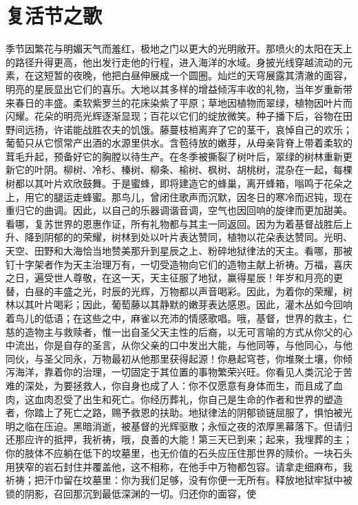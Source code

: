 
\chapter{复活节之歌}


\par

季节因繁花与明媚天气而羞红，极地之门以更大的光明敞开。那喷火的太阳在天上的路径升得更高，他出发行走他的行程，进入海洋的水域。身披光线穿越流动的元素，在这短暂的夜晚，他把白昼伸展成一个圆圈。灿烂的天穹展露其清澈的面容，明亮的星辰显出它们的喜乐。大地以其多样的增益倾泻丰收的礼物，当年岁重新带来春日的丰盛。柔软紫罗兰的花床染紫了平原；草地因植物而翠绿，植物因叶片而闪耀。花朵的明亮光辉逐渐显现；百花以它们的绽放微笑。种子播下后，谷物在田野间远扬，许诺能战胜农夫的饥饿。藤蔓枝梢离弃了它的茎干，哀悼自己的欢乐；葡萄只从它惯常产出酒的水源里供水。含苞待放的嫩芽，从母亲背脊上带着柔软的茸毛升起，预备好它的胸膛以待生产。在冬季被撕裂了树叶后，翠绿的树林重新更新它的叶阴。柳树、冷杉、榛树、柳条、榆树、枫树、胡桃树，混杂在一起，每棵树都以其叶片欢欣鼓舞。于是蜜蜂，即将建造它的蜂巢，离开蜂箱，嗡鸣于花朵之上，用它的腿运走蜂蜜。那鸟儿，曾闭住歌声而沉默，因冬日的寒冷而迟钝，现在重归它的曲调。因此，以自己的乐器调谐音调，空气也因回响的旋律而更加甜美。看哪，复苏世界的恩惠作证，所有礼物都与其主一同返回。\newline{}因为为着基督战胜后上升、降到阴郁的的荣耀，树林到处以叶片表达赞同，植物以花朵表达赞同。光明、天空、田野和大海恰当地赞美那升到星辰之上、粉碎地狱律法的天主。看哪，那被钉十字架者作为天主治理万有，一切受造物向它们的造物主献上祈祷。万福，喜庆之日，遍受世人尊敬，在这一天，天主征服了地狱，赢得星辰！年岁和月亮的更替，白昼的丰盛之光，时辰的光辉，万物都以声音喝彩。因此，为着你的荣耀，树林以其叶片喝彩；因此，葡萄藤以其静默的嫩芽表达感恩。因此，灌木丛如今回响着鸟儿的低语；在这些之中，麻雀以充沛的情感歌唱。\newline{}哦，基督，世界的救主，仁慈的造物主与救赎者，惟一出自圣父天主性的后裔，以无可言喻的方式从你父的心中流出，你是自存的圣言，从你父亲的口中发出大能，与他同等，与他同心，与他同伙，与圣父同永，万物最初从他那里获得起源！你悬起穹苍，你堆聚土壤，你倾泻海洋，靠着你的治理，一切固定于其位置的事物繁荣兴旺。你看见人类沉沦于苦难的深处，为要拯救人，你自身也成了人：你不仅愿意有身体而生，而且成了血肉，这血肉忍受了出生和死亡。你经历葬礼，你自己是生命的作者和世界的塑造者，你踏上了死亡之路，赐予救恩的扶助。地狱律法的阴郁锁链屈服了，惧怕被光明之临在压迫。黑暗消逝，被基督的光辉驱散；永恒之夜的浓厚黑幕落下。\newline{}但请归还那应许的抵押，我祈祷，哦，良善的大能！第三天已到来；起来，我埋葬的主；你的肢体不应躺在低下的坟墓里，也无价值的石头应压住那世界的赎价。一块石头用狭窄的岩石封住并覆盖他，这不相称，在他手中万物都包容。请拿走细麻布，我祈祷；把汗巾留在坟墓里：你为我们足够，没有你便一无所有。释放地狱牢狱中被锁的阴影，召回那沉到最低深渊的一切。归还你的面容，使